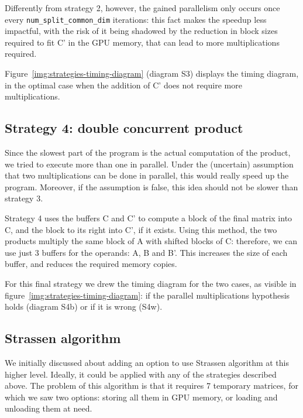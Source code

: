 Differently from strategy 2, however, the gained parallelism only occurs once every \texttt{num\_split\_common\_dim} iterations: this fact makes the speedup less impactful, with the risk of it being shadowed by the reduction in block sizes required to fit C' in the GPU memory, that can lead to more multiplications required.

Figure~\ref{img:strategies-timing-diagram} (diagram S3) displays the timing diagram, in the optimal case when the addition of C' does not require more multiplications.


\subsection{Strategy 4: double concurrent product}

Since the slowest part of the program is the actual computation of the product, we tried to execute more than one in parallel.
Under the (uncertain) assumption that two multiplications can be done in parallel, this would really speed up the program.
Moreover, if the assumption is false, this idea should not be slower than strategy 3.

Strategy 4 uses the buffers C and C' to compute a block of the final matrix into C, and the block to its right into C', if it exists.
Using this method, the two products multiply the same block of A with shifted blocks of C: therefore, we can use just 3 buffers for the operands: A, B and B'.
This increases the size of each buffer, and reduces the required memory copies.

For this final strategy we drew the timing diagram for the two cases, as visible in figure~\ref{img:strategies-timing-diagram}: if the parallel multiplications hypothesis holds (diagram S4b) or if it is wrong (S4w).


\subsection{Strassen algorithm}

We initially discussed about adding an option to use Strassen algorithm at this higher level.
Ideally, it could be applied with any of the strategies described above.
The problem of this algorithm is that it requires 7 temporary matrices, for which we saw two options: storing all them in GPU memory, or loading and unloading them at need.

